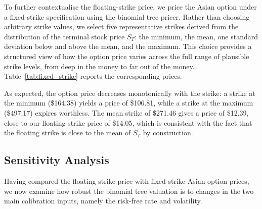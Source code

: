 \documentclass[hidelinks, 12pt, a4paper]{article}
\theoremstyle{definition}
\begin{document}
To further contextualise the floating-strike price, we price the Asian option under 
a fixed-strike specification using the binomial tree pricer. Rather than choosing 
arbitrary strike values, we select five representative strikes derived from the 
distribution of the terminal stock price $S_T$: the minimum, the mean, one standard 
deviation below and above the mean, and the maximum. This choice provides a 
structured view of how the option price varies across the full range of plausible 
strike levels, from deep in the money to far out of the money. Table~\ref{tab:fixed_strike} reports the 
corresponding prices.

As expected, the option price decreases monotonically with the strike: a strike at 
the minimum (\$164.38) yields a price of \$106.81, while a strike at the maximum 
(\$497.17) expires worthless. The mean strike of \$271.46 gives a price of \$12.39, 
close to our floating-strike price of \$14.05, which is consistent with the fact 
that the floating strike is close to the mean of $S_T$ by construction.

\newpage
\subsection{Sensitivity Analysis}

Having compared the floating-strike price with fixed-strike Asian option prices, 
we now examine how robust the binomial tree valuation is to changes in the two 
main calibration inputs, namely the risk-free rate and volatility.
\end{document}
